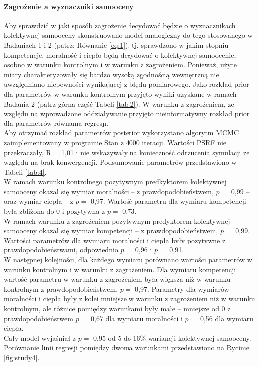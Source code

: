 \documentclass[man]{apa6}
\begin{document}
\paragraph{Zagrożenie a wyznaczniki samooceny}
Aby sprawdzić w jaki sposób zagrożenie decydować będzie o wyznacznikach kolektywnej samooceny skonstruowano model analogiczny do tego stosowanego w Badaniach 1 i 2 (patrz: Równanie \ref{eq:1}), tj. sprawdzono w jakim stopniu kompetencje, moralność i ciepło będą decydować o kolektywnej samoocenie, osobno w warunku kontrolnym i w warunku z zagrożeniem. Ponieważ, użyte miary charakteryzowały się bardzo wysoką zgodnością wewnętrzną nie uwzględniano niepewności wynikającej z błędu pomiarowego. Jako rozkład prior dla parametrów w warunku kontrolnym przyjęto wyniki uzyskane w ramach Badania 2 (patrz górna część Tabeli \ref{tab:2}). W warunku z zagrożeniem, ze względu na wprowadzone oddziaływanie przyjęto nieinformatywny rozkład prior dla parametrów równania regresji.\\
Aby otrzymać rozkład parametrów posterior wykorzystano algorytm MCMC zaimplementowany w programie Stan z 4000 iteracji. Wartości PSRF nie przekraczały, R = 1,01 i nie wskazywały na konieczność odrzucenia symulacji ze względu na brak konwergencji. Podsumowanie parametrów przedstawiono w Tabeli \ref{tab:4}. \\
W ramach warunku kontrolnego pozytywnym predkyktorem kolektywnej samooceny okazał się wymiar moralności -- z prawdopodobieństwem, $p =$ 0,99 -- oraz wymiar ciepła -- z $p =$ 0,97. Wartość parametru dla wymiaru kompetencji była zbliżona do 0 i pozytywna z $p =$ 0,73. \\
W ramach warunku z zagrożeniem pozytywnym predyktorem kolektywnej samooceny okazał się wymiar kompetencji -- z prawdopodobieństwem, $p =$ 0,99. Wartości parametrów dla wymiaru moralności i ciepła były pozytywne z prawdopodobieństwami, odpowiednio $p =$ 0,96 i $p =$ 0,91.\\
W następnej kolejności, dla każdego wymiaru porównano wartości parametrów w warunku kontrolnym i w warunku z zagrożeniem. Dla wymiaru kompetencji wartość parametru w warunku z zagrożeniem była większa niż w warunku kontrolnym z prawdopodobieństwem, $p =$ 0,97. Parametry dla wymiarów moralności i ciepła były z kolei mniejsze w warunku z zagrożeniem niż w warunku kontrolnym, ale różnice pomiędzy warunkami były małe -- mniejsze od 0 z prawdopodobieństwem $p = $ 0,67 dla wymiaru moralności i $p =$ 0,56 dla wymiaru ciepła.\\
Cały model wyjaśniał z $p =$ 0,95 od 5 do 16\% wariancji kolektywnej samooceny. Porównanie linii regresji pomiędzy dwoma warunkami przedstawiono na Rycinie \ref{fig:study4}.\\
\end{document}
